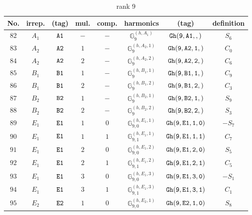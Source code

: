 \documentclass[fleqn,8pt]{jsarticle}
\begin{document}
\begin{table}[ht!]
\begin{center}
\caption{rank 9}
\renewcommand{\arraystretch}{1.3}
\begin{tabular}{cccccccc} \hline \hline
No. & irrep. & (tag) & mul. & comp. & harmonics & (tag) & definition \\ \hline
$ 82 $ & $ A_{1} $ & $ {\tt A1} $ & $ - $ & $ - $ & $ \mathbb{G}_{9}^{(h,A_{1})} $ & $ {\tt Gh(9,A1,,)} $ & $ S_{6} $ \\
$ 83 $ & $ A_{2} $ & $ {\tt A2} $ & $ 1 $ & $ - $ & $ \mathbb{G}_{9}^{(h,A_{2},1)} $ & $ {\tt Gh(9,A2,1,)} $ & $ C_{0} $ \\
$ 84 $ & $ A_{2} $ & $ {\tt A2} $ & $ 2 $ & $ - $ & $ \mathbb{G}_{9}^{(h,A_{2},2)} $ & $ {\tt Gh(9,A2,2,)} $ & $ C_{6} $ \\
$ 85 $ & $ B_{1} $ & $ {\tt B1} $ & $ 1 $ & $ - $ & $ \mathbb{G}_{9}^{(h,B_{1},1)} $ & $ {\tt Gh(9,B1,1,)} $ & $ C_{9} $ \\
$ 86 $ & $ B_{1} $ & $ {\tt B1} $ & $ 2 $ & $ - $ & $ \mathbb{G}_{9}^{(h,B_{1},2)} $ & $ {\tt Gh(9,B1,2,)} $ & $ C_{3} $ \\
$ 87 $ & $ B_{2} $ & $ {\tt B2} $ & $ 1 $ & $ - $ & $ \mathbb{G}_{9}^{(h,B_{2},1)} $ & $ {\tt Gh(9,B2,1,)} $ & $ S_{9} $ \\
$ 88 $ & $ B_{2} $ & $ {\tt B2} $ & $ 2 $ & $ - $ & $ \mathbb{G}_{9}^{(h,B_{2},2)} $ & $ {\tt Gh(9,B2,2,)} $ & $ S_{3} $ \\
$ 89 $ & $ E_{1} $ & $ {\tt E1} $ & $ 1 $ & $ 0 $ & $ \mathbb{G}_{9,0}^{(h,E_{1},1)} $ & $ {\tt Gh(9,E1,1,0)} $ & $ - S_{7} $ \\
$ 90 $ & $ E_{1} $ & $ {\tt E1} $ & $ 1 $ & $ 1 $ & $ \mathbb{G}_{9,1}^{(h,E_{1},1)} $ & $ {\tt Gh(9,E1,1,1)} $ & $ C_{7} $ \\
$ 91 $ & $ E_{1} $ & $ {\tt E1} $ & $ 2 $ & $ 0 $ & $ \mathbb{G}_{9,0}^{(h,E_{1},2)} $ & $ {\tt Gh(9,E1,2,0)} $ & $ S_{5} $ \\
$ 92 $ & $ E_{1} $ & $ {\tt E1} $ & $ 2 $ & $ 1 $ & $ \mathbb{G}_{9,1}^{(h,E_{1},2)} $ & $ {\tt Gh(9,E1,2,1)} $ & $ C_{5} $ \\
$ 93 $ & $ E_{1} $ & $ {\tt E1} $ & $ 3 $ & $ 0 $ & $ \mathbb{G}_{9,0}^{(h,E_{1},3)} $ & $ {\tt Gh(9,E1,3,0)} $ & $ - S_{1} $ \\
$ 94 $ & $ E_{1} $ & $ {\tt E1} $ & $ 3 $ & $ 1 $ & $ \mathbb{G}_{9,1}^{(h,E_{1},3)} $ & $ {\tt Gh(9,E1,3,1)} $ & $ C_{1} $ \\
$ 95 $ & $ E_{2} $ & $ {\tt E2} $ & $ 1 $ & $ 0 $ & $ \mathbb{G}_{9,0}^{(h,E_{2},1)} $ & $ {\tt Gh(9,E2,1,0)} $ & $ S_{8} $ \\

\end{tabular}
\end{center}
\end{table}
\end{document}
